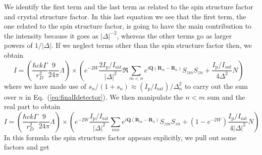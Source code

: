 \documentclass[11pt,letter]{article}
\newcommand{\bv}[1]{\ensuremath{\bm{#1}}}
\newcommand{\iisat}{\ensuremath{I_{\mathrm{p}}/I_{\mathrm{sat}}}}
\begin{document}
We identify the first term and the last term as related to the spin structure
factor and crystal structure factor.
In this last equation we see that the first term, the one related to the spin
structure factor, is going to have the main contribution to the intensity
because it goes as $ |\Delta|^{-2} $, whereas the other terms go as larger
powers of $1/|\Delta|$.  If we neglect terms other than the spin structure
factor then,  we obtain 
\begin{equation}
 I  =
 \left( 
 \frac{\hbar c k \Gamma}{r_{D}^{2}}  
     \frac{9}{24\pi} \Lambda 
  \right) \times 
  \left(
    e^{-2W} \frac{2\iisat}{ |\Delta|^{2} }  \Re \sum_{m<n}  
      e^{ i \bv{Q}( \bv{R}_{m} - \bv{R}_{n} ) } 
      S_{zm}S_{zn}  
  +  \frac{I_{\mathrm{p}}/I_{sat}}{ 4 \Delta^{2} } N
  \right)
\end{equation}
where we have made use of $s_{n}/(1+s_{n}) \approx (\iisat)/ \Delta_{n}^{2}$ to carry out the sum over $n$ in Eq.~(\ref{eq:finalIdetector}).  We then manipulate the $n<m$ sum and the real part to obtain
\begin{equation}
 I  =
 \left( 
 \frac{\hbar c k \Gamma}{r_{D}^{2}}  
     \frac{9}{24\pi} \Lambda 
  \right) \times 
  \left(
    e^{-2W} \frac{\iisat}{ |\Delta|^{2} }  \sum_{m n}  
      e^{ i \bv{Q}( \bv{R}_{m} - \bv{R}_{n} ) } 
      S_{zm}S_{zn}  
  + (1- e^{-2W}) \frac{\iisat}{ 4|\Delta|^{2} }  N
  \right)
\end{equation}
In this formula the spin structure factor appears explicitly, we pull out some factors and get  
\end{document}
